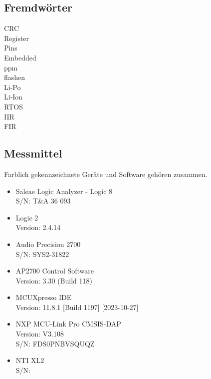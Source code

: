 \documentclass[12pt]{article}
\begin{document}
	\subsection{Fremdwörter}
	CRC \\
	Register \\
	Pins \\
	Embedded \\
	ppm \\
	flashen \\
	Li-Po \\
	Li-Ion \\
	RTOS \\
	IIR\\
	FIR\\
	
	\newpage
	\subsection{Messmittel}
	Farblich gekennzeichnete Geräte und Software gehören zusammen.
\begin{itemize}
	\color{green}
	\item Saleae Logic Analyzer - Logic 8 \\
	S/N: T\&A 36 093
	\item Logic 2 \\
	Version: 2.4.14
	\color{red}
	\item Audio Precision 2700 \\
	S/N: SYS2-31822
	\item AP2700 Control Software \\
	Version: 3.30 (Build 118)
	\color{blue}
	\item MCUXpresso IDE\\
	Version: 11.8.1 [Build 1197] [2023-10-27]
	\item NXP MCU-Link Pro CMSIS-DAP \\
	Version: V3.108 \\
	S/N: FDS0PNBVSQUQZ
	\color{brown}
	\item NTI XL2 \\
	S/N:
	\color{black}
\end{itemize}
	\newpage
\end{document}

